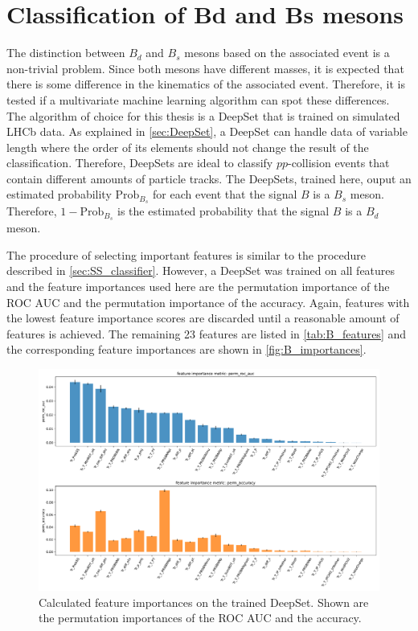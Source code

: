 \section{Classification of Bd and Bs mesons}

The distinction between $B_d$ and $B_s$ mesons based on the associated event is a non-trivial problem.
Since both mesons have different masses, it is expected that there is some difference in the kinematics of the associated event.
Therefore, it is tested if a multivariate machine learning algorithm can spot these differences.
The algorithm of choice for this thesis is a DeepSet that is trained on simulated LHCb data.
As explained in \autoref{sec:DeepSet}, a DeepSet can handle data of variable length where the order of its elements should not change the result of the classification.
Therefore, DeepSets are ideal to classify $pp$-collision events that contain different amounts of particle tracks.
The DeepSets, trained here, ouput an estimated probability $\text{Prob}_{B_s}$ for each event that the signal $B$ is a $B_s$ meson.
Therefore, $1-\text{Prob}_{B_s}$ is the estimated probability that the signal $B$ is a $B_d$ meson.

The procedure of selecting important features is similar to the procedure described in \autoref{sec:SS_classifier}.
However, a DeepSet was trained on all features and the feature importances used here are the permutation importance of the ROC AUC and the permutation importance of the accuracy.
Again, features with the lowest feature importance scores are discarded until a reasonable amount of features is achieved.
The remaining 23 features are listed in \autoref{tab:B_features} and the corresponding feature importances are shown in \autoref{fig:B_importances}.

\begin{figure}
    \centering
    \includegraphics[width=\textwidth]{images/B_feature_importances.pdf}
    \caption{Calculated feature importances on the trained DeepSet. Shown are the permutation importances of the ROC AUC and the accuracy.}
    \label{fig:B_importances}
\end{figure}

